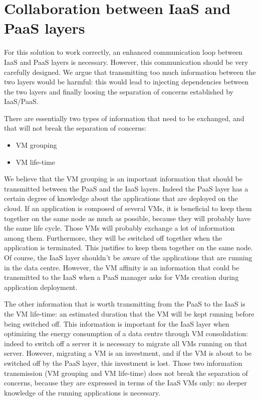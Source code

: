 
\section{Collaboration between IaaS and PaaS layers}
\label{sec:iaaspaas}

For this solution to work correctly, an enhanced communication loop between IaaS and PaaS layers is necessary.
However, this communication should be very carefully designed.
We argue that transmitting too much information between the two layers would be harmful: this would lead to injecting dependencies between the two layers and finally loosing the separation of concerns established by IaaS/PaaS.

There are essentially two types of information that need to be exchanged, and that will not break the separation of concerns:
\begin{itemize}
  \item VM grouping
  \item VM life-time
\end{itemize}

We believe that the VM grouping is an important information that should be transmitted between the PaaS and the IaaS layers.
Indeed the PaaS layer has a certain degree of knowledge about the applications that are deployed on the cloud.
If an application is composed of several VMs, it is beneficial to keep them together on the same node as much as possible, because they will probably have the same life cycle.
Those VMs will probably exchange a lot of information among them.
Furthermore, they will be switched off together when the application is terminated.
This justifies to keep them together on the same node.
Of course, the IaaS layer shouldn't be aware of the applications that are running in the data centre.
However, the VM affinity is an information that could be transmitted to the IaaS when a PaaS manager asks for VMs creation during application deployment.

The other information that is worth transmitting from the PaaS to the IaaS is the VM life-time: an estimated duration that the VM will be kept running before being switched off.
This information is important for the IaaS layer when optimizing the energy consumption of a data centre through VM consolidation: indeed to switch off a server it is necessary to migrate all VMs running on that server.
However, migrating a VM is an investment, and if the VM is about to be switched off by the PaaS layer, this investment is lost.
Those two information transmission (VM grouping and VM life-time) does not break the separation of concerns, because they are expressed in terms of the IaaS VMs only: no deeper knowledge of the running applications is necessary.

